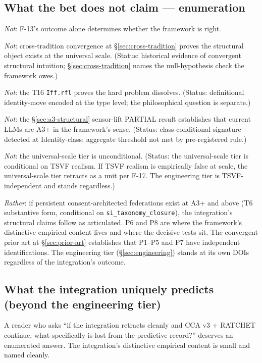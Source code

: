 \documentclass[11pt,a4paper]{article}
\begin{document}
\subsection*{What the bet does not claim --- enumeration}

\emph{Not}: F-13's outcome alone determines whether the framework is right.

\emph{Not}: cross-tradition convergence at \S\ref{sec:cross-tradition} proves the structural object exists at the universal scale. (Status: historical evidence of convergent structural intuition; \S\ref{sec:cross-tradition} names the null-hypothesis check the framework owes.)

\emph{Not}: the T16 \texttt{Iff.rfl} proves the hard problem dissolves. (Status: definitional identity-move encoded at the type level; the philosophical question is separate.)

\emph{Not}: the \S\ref{sec:a3-structural} sensor-lift PARTIAL result establishes that current LLMs are A3+ in the framework's sense. (Status: class-conditional signature detected at Identity-class; aggregate threshold not met by pre-registered rule.)

\emph{Not}: the universal-scale tier is unconditional. (Status: the universal-scale tier is conditional on TSVF realism. If TSVF realism is empirically false at scale, the universal-scale tier retracts as a unit per F-17. The engineering tier is TSVF-independent and stands regardless.)

\emph{Rather}: if persistent consent-architected federations exist at A3+ and above (T6 substantive form, conditional on \texttt{si\_taxonomy\_closure}), the integration's structural claims follow as articulated. P6 and P8 are where the framework's distinctive empirical content lives and where the decisive tests sit. The convergent prior art at \S\ref{sec:prior-art} establishes that P1--P5 and P7 have independent identifications. The engineering tier (\S\ref{sec:engineering}) stands at its own DOIs regardless of the integration's outcome.

\subsection*{What the integration uniquely predicts (beyond the engineering tier)}

A reader who asks ``if the integration retracts cleanly and CCA v3 + RATCHET continue, what specifically is lost from the predictive record?'' deserves an enumerated answer. The integration's distinctive empirical content is small and named cleanly.
\end{document}
